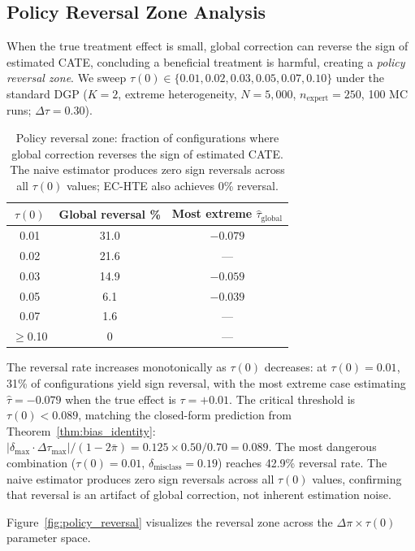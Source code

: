 \subsection{Policy Reversal Zone Analysis}
\label{app:policy_reversal}

When the true treatment effect is small, global correction can reverse the sign of estimated CATE, concluding a beneficial treatment is harmful, creating a \emph{policy reversal zone}.
We sweep $\tau(0) \in \{0.01, 0.02, 0.03, 0.05, 0.07, 0.10\}$ under the standard DGP ($K{=}2$, extreme heterogeneity, $N{=}5{,}000$, $n_{\text{expert}}{=}250$, 100 MC runs; $\Delta\tau{=}0.30$).

\begin{table}[h]
\centering
\caption{Policy reversal zone: fraction of configurations where global correction reverses the sign of estimated CATE.
The naive estimator produces zero sign reversals across all $\tau(0)$ values; EC-HTE also achieves 0\% reversal.}
\label{tab:policy_reversal}
\small
\begin{tabular}{ccc}
\toprule
$\tau(0)$ & Global reversal \% & Most extreme $\hat{\tau}_{\text{global}}$ \\
\midrule
0.01 & 31.0 & $-0.079$ \\
0.02 & 21.6 & --- \\
0.03 & 14.9 & $-0.059$ \\
0.05 & 6.1  & $-0.039$ \\
0.07 & 1.6  & --- \\
$\geq$0.10 & 0 & --- \\
\bottomrule
\end{tabular}
\end{table}

The reversal rate increases monotonically as $\tau(0)$ decreases: at $\tau(0) = 0.01$, 31\% of configurations yield sign reversal, with the most extreme case estimating $\hat{\tau} = -0.079$ when the true effect is $\tau = +0.01$.
The critical threshold is $\tau(0) < 0.089$, matching the closed-form prediction from Theorem~\ref{thm:bias_identity}: $|\delta_{\max} \cdot \Delta\tau_{\max}| / (1 - 2\bar{\pi}) = 0.125 \times 0.50 / 0.70 = 0.089$.
The most dangerous combination ($\tau(0) = 0.01$, $\delta_{\text{misclass}} = 0.19$) reaches 42.9\% reversal rate.
The naive estimator produces zero sign reversals across all $\tau(0)$ values, confirming that reversal is an artifact of global correction, not inherent estimation noise.

Figure~\ref{fig:policy_reversal} visualizes the reversal zone across the $\Delta\pi \times \tau(0)$ parameter space.

